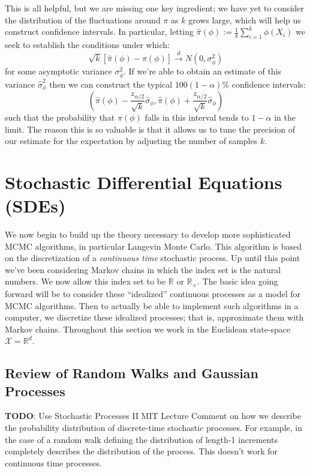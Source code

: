 \documentclass[12pt]{article}
\newcommand{\R}{\mathcal{R}}
\def\R{\mathbb{R}}
\begin{document}
This is all helpful, but we are missing one key ingredient; we have yet to consider the distribution of the fluctuations around $\pi$ as $k$ grows large, which will help us 
construct confidence intervals. In particular, letting $\hat{\pi}(\phi) := \frac{1}{k} \sum_{i = 1}^{k} \phi(X_i)$ we seek to establish the conditions under which: 
\[\sqrt{k}[\hat{\pi}(\phi) - \pi(\phi)] \overset{d}{\to} N(0, \sigma_\phi^2)\]
for some asymptotic variance $\sigma_\phi^2$. If we're able to obtain an estimate of this variance $\hat{\sigma}_\phi^2$ then we can construct the typical 
$100(1 - \alpha)\%$ confidence intervals: 
\[\left(\hat{\pi}(\phi) - \frac{z_{\alpha/2}}{\sqrt{k}}\hat{\sigma}_\phi, \hat{\pi}(\phi) + \frac{z_{\alpha/2}}{\sqrt{k}}\hat{\sigma}_\phi \right)\]
such that the probability that $\pi(\phi)$ falls in this interval tends to $1 - \alpha$ in the limit. The reason this is so valuable is that it allows us to tune the precision 
of our estimate for the expectation by adjusting the number of samples $k$. 

\section{Stochastic Differential Equations (SDEs)}
We now begin to build up the theory necessary to develop more sophisticated MCMC algorithms, in particular Langevin Monte Carlo. This algorithm is based on the 
discretization of a \textit{continuous time} stochastic process. Up until this point we've been considering Markov chains in which the index set is the natural numbers. 
We now allow this index set to be $\R$ or $\R_+$. The basic idea going forward will be to consider these ``idealized'' continuous processes as a model for MCMC algorithms. 
Then to actually be able to implement such algorithms in a computer, we discretize these idealized processes; that is, approximate them with Markov chains. Throughout this 
section we work in the Euclidean state-space $\mathcal{X} = \R^d$. 

\subsection{Review of Random Walks and Gaussian Processes}
\textbf{TODO}: Use Stochastic Processes II MIT Lecture
Comment on how we describe the probability distribution of discrete-time stochastic processes. For example, in the case of a random walk defining the distribution of length-1
increments completely describes the distribution of the process. This doesn't work for continuous time processes. 
\end{document}
